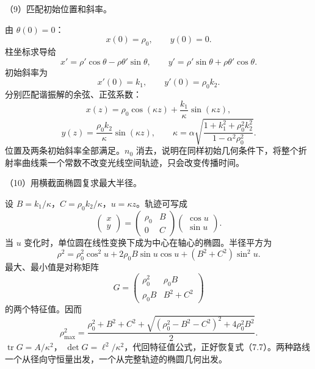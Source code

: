 \documentclass[12pt,a4paper,fontset=fandol]{ctexart}
\begin{document}
（9）匹配初始位置和斜率。

由 \(\theta(0)=0\)： \[
x(0)=\rho_0,\qquad y(0)=0.
\] 柱坐标求导给 \[
x'=\rho'\cos\theta-\rho\theta'\sin\theta,\qquad
y'=\rho'\sin\theta+\rho\theta'\cos\theta.
\] 初始斜率为 \[
x'(0)=k_1,\qquad y'(0)=\rho_0k_2.
\] 分别匹配谐振解的余弦、正弦系数： \[
\boxed{x(z)=\rho_0\cos(\kappa z)
+\frac{k_1}{\kappa}\sin(\kappa z),}\tag{7.9}
\] \[
\boxed{y(z)=\frac{\rho_0k_2}{\kappa}\sin(\kappa z),\qquad
\kappa=\alpha\sqrt{\frac{1+k_1^2+\rho_0^2k_2^2}
{1-\alpha^2\rho_0^2}}.}\tag{7.10}
\] 位置及两条初始斜率全部满足。\(n_0\)
消去，说明在同样初始几何条件下，将整个折射率曲线乘一个常数不改变光线空间轨迹，只会改变传播时间。

（10）用横截面椭圆复求最大半径。

设 \(B=k_1/\kappa\)，\(C=\rho_0k_2/\kappa\)，\(u=\kappa z\)。轨迹可写成
\[
\begin{pmatrix}x\\y\end{pmatrix}
=
\begin{pmatrix}\rho_0&B\\0&C\end{pmatrix}
\begin{pmatrix}\cos u\\\sin u\end{pmatrix}.
\] 当 \(u\) 变化时，单位圆在线性变换下成为中心在轴心的椭圆。半径平方为
\[
\rho^2=\rho_0^2\cos^2u+2\rho_0B\sin u\cos u
+(B^2+C^2)\sin^2u.
\] 最大、最小值是对称矩阵 \[
G=
\begin{pmatrix}
\rho_0^2&\rho_0B\\
\rho_0B&B^2+C^2
\end{pmatrix}
\] 的两个特征值。因而 \[
\boxed{\rho_{\max}^2=
\frac{\rho_0^2+B^2+C^2+
\sqrt{(\rho_0^2-B^2-C^2)^2+4\rho_0^2B^2}}2.}\tag{7.11}
\] \(\operatorname{tr}G=A/\kappa^2\)，
\(\det G=\ell^2/\kappa^2\)，代回特征值公式，正好恢复式（7.7）。两种路线一个从径向守恒量出发，一个从完整轨迹的椭圆几何出发。

\begin{center}
\begin{minipage}{\linewidth}
\centering\begingroup
{}
\ifdim\wd\diagrambox>.88\linewidth
\sbox{\diagrambox}{\resizebox{.88\linewidth}{!}{\usebox{\diagrambox}}}
\fi
\ifdim\ht\diagrambox>.40\textheight
\resizebox{!}{.40\textheight}{\usebox{\diagrambox}}
\else\usebox{\diagrambox}\fi
\par{}
\endgroup\end{minipage}
\end{center}
\end{document}
